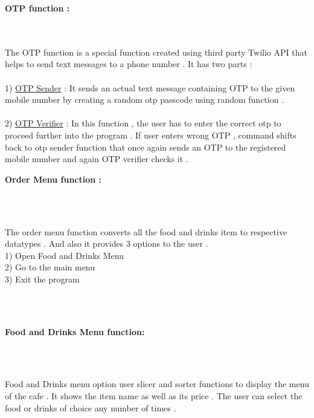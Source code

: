 \documentclass[11pt, a4paper]{article}
\begin{document}
\begin{left}
    \textbf{\Large{OTP function :}}
\end{left}
\\\\
\large{{The OTP function is a special function \vspace{2mm} created using third party Twilio API that helps to send text messages to a phone number . It has two parts : \\\\
1) \underline{OTP Sender} : It sends an actual \vspace{2mm} text message containing OTP to the given mobile number by creating a random otp passcode using random function .\\
}}
\\
2) \underline{OTP Verifier} : In this function \vspace{2mm}, the user has to enter the correct otp to proceed further \vspace{2mm} into the program . If user enters wrong OTP , command shifts back to otp sender function that once again sends an OTP to the registered mobile number and again OTP verifier checks it .
\\
\vspace{0.7cm}
\newpage

\begin{left}
    \textbf{\Large{Order Menu function :}}
\end{left}
\\\\
\large{{The order menu function\vspace{2mm} converts all the food and drinks item to respective datatypes . And also it provides\vspace{2mm} 3 options to the user . \\
1) Open Food and\vspace{2mm} Drinks Menu\\
2) Go to the main \vspace{2mm}menu \\
3) Exit the program

}}
\\\\
\vspace{1.5cm}

\begin{left}
    \textbf{\Large{Food and Drinks Menu function:}}
\end{left}
\\\\
\large{{Food and Drinks menu option user slicer \vspace{2mm} and sorter functions to display the menu of the cafe . It shows the item name as well as its price . The user can select\vspace{2mm} the food or drinks of choice any number of times . 

}}
\\\\
\vspace{1.5cm}
\end{document}
